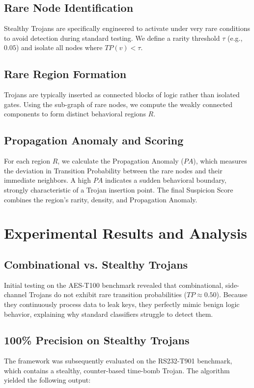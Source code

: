\documentclass[11pt,a4paper]{article}
\begin{document}
\subsection{Rare Node Identification}
Stealthy Trojans are specifically engineered to activate under very rare conditions to avoid detection during standard testing. We define a rarity threshold $\tau$ (e.g., $0.05$) and isolate all nodes where $TP(v) < \tau$. 

\subsection{Rare Region Formation}
Trojans are typically inserted as connected blocks of logic rather than isolated gates. Using the sub-graph of rare nodes, we compute the weakly connected components to form distinct behavioral regions $R$. 

\subsection{Propagation Anomaly and Scoring}
For each region $R$, we calculate the Propagation Anomaly ($PA$), which measures the deviation in Transition Probability between the rare nodes and their immediate neighbors. A high $PA$ indicates a sudden behavioral boundary, strongly characteristic of a Trojan insertion point. The final Suspicion Score combines the region's rarity, density, and Propagation Anomaly.

\section{Experimental Results and Analysis}

\subsection{Combinational vs. Stealthy Trojans}
Initial testing on the AES-T100 benchmark revealed that combinational, side-channel Trojans do not exhibit rare transition probabilities ($TP \approx 0.50$). Because they continuously process data to leak keys, they perfectly mimic benign logic behavior, explaining why standard classifiers struggle to detect them. 

\subsection{100\% Precision on Stealthy Trojans}
The framework was subsequently evaluated on the RS232-T901 benchmark, which contains a stealthy, counter-based time-bomb Trojan. The algorithm yielded the following output:
\end{document}
